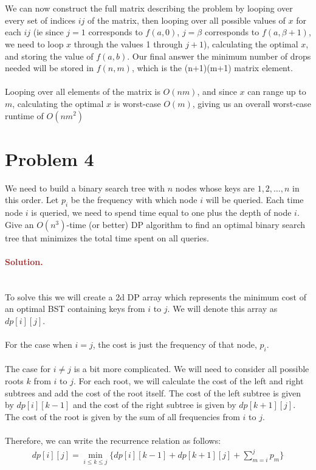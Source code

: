 \\ \\ We can now construct the full matrix describing the problem by looping over every set of indices $ij$ of the matrix, then looping over all possible values of $x$ for each $ij$ (ie since $j=1$ corresponds to $f(a, 0)$, $j=\beta$ corresponds to $f(a, \beta+1)$,  we need to loop $x$ through the values 1 through $j+1$), calculating the optimal $x$, and storing the value of $f(a,b)$. Our final answer the minimum number of drops needed will be stored in $f(n, m)$, which is the (n+1)(m+1) matrix element. 
\\ \\ Looping over all elements of the matrix is $O(nm)$, and since $x$ can range up to $m$, calculating the optimal $x$ is worst-case $O(m)$, giving us an overall worst-case runtime of $O(nm^2)$


\section*{Problem 4}
We need to build a binary search tree with $n$ nodes whose keys are $1, 2, \ldots, n$ in this order. Let $p_i$ be the frequency with which node $i$ will be queried. Each time node $i$ is queried, we need to spend time equal to one plus the depth of node $i$. Give an $O(n^3)$-time (or better) DP algorithm to find an optimal binary search tree that minimizes the total time spent on all queries.

\paragraph{\textcolor{brown}{Solution.}} \: \\
To solve this we will create a 2d DP array which represents the minimum cost of an optimal BST containing keys from $i$ to $j$. We will denote this array as $dp[i][j]$.\\ \\ For the case when $i=j$, the cost is just the frequency of that node, $p_i$.\\ \\ The case for $i \neq j$ is a bit more complicated. We will need to consider all possible roots $k$ from $i$ to $j$. For each root, we will calculate the cost of the left and right subtrees and add the cost of the root itself. The cost of the left subtree is given by $dp[i][k-1]$ and the cost of the right subtree is given by $dp[k+1][j]$. The cost of the root is given by the sum of all frequencies from $i$ to $j$.\\ \\ Therefore, we can write the recurrence relation as follows:
\begin{gather*}
    dp[i][j] = \min_{i \leq k \leq j} \{dp[i][k-1] + dp[k+1][j] + \sum_{m=i}^{j} p_m\}
\end{gather*}



